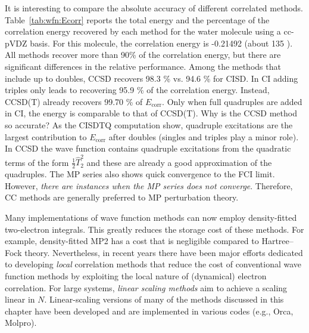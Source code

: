 \documentclass[../Main/chem371-notes.tex]{subfiles}
\begin{document}
It is interesting to compare the absolute accuracy of different correlated methods.
Table~\ref{tab:wfn:Ecorr} reports the total energy and the percentage of the correlation energy recovered by each method for the water molecule using a cc-pVDZ basis.
For this molecule, the correlation energy is -0.21492 \Eh (about 135 \kcal).
All methods recover more than 90\% of the correlation energy, but there are significant differences in the relative performance.
Among the methods that include up to doubles, CCSD recovers 98.3 \% vs. 94.6 \% for CISD.
In CI adding triples only leads to recovering 95.9 \% of the correlation energy.
Instead, CCSD(T) already recovers 99.70 \% of $E_\mathrm{corr}$.
Only when full quadruples are added in CI, the energy is comparable to that of CCSD(T).
Why is the CCSD method so accurate? As the CISDTQ computation show, quadruple excitations are the largest contribution to $E_\mathrm{corr}$ after doubles (singles and triples play a minor role).
In CCSD the wave function contains quadruple excitations from the quadratic terms of the form $\frac{1}{2} \hat{T}_2^2$ and these are already a good approximation of the quadruples.
The MP series also shows quick convergence to the FCI limit.
However, \emph{there are instances when the MP series does not converge}. Therefore, CC methods are generally preferred to MP perturbation theory.

Many implementations of wave function methods can now employ density-fitted two-electron integrals.
This greatly reduces the storage cost of these methods.
For example, density-fitted MP2 has a cost that is negligible compared to Hartree--Fock theory.
Nevertheless, in recent years there have been major efforts dedicated to developing \emph{local} correlation methods that reduce the cost of conventional wave function methods by exploiting the local nature of (dynamical) electron correlation.
For large systems, \emph{linear scaling methods} aim to achieve a scaling linear in $N$.
Linear-scaling versions of many of the methods discussed in this chapter have been developed and are implemented in various codes (e.g., Orca, Molpro).
\end{document}
